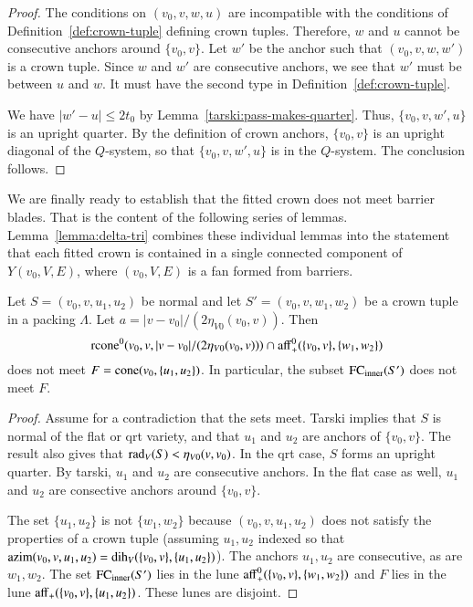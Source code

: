 \begin{proof} The conditions on $(v_0,v,w,u)$ are incompatible with the
conditions of Definition~\ref{def:crown-tuple} defining crown tuples.
Therefore, $w$ and $u$ cannot be consecutive anchors around
$\{v_0,v\}$.  Let $w'$ be the anchor such that $(v_0,v,w,w')$
is a crown tuple.  Since $w$ and $w'$ are consecutive anchors,
we see that $w'$ must be between $u$ and $w$.  It must have the
second type in Definition~\ref{def:crown-tuple}.  

We have $|w'-u|\le 2t_0$ by Lemma~\ref{tarski:pass-makes-quarter}.  
Thus, $\{v_0,v,w',u\}$
is an upright quarter.  By the definition of crown anchors, $\{v_0,v\}$
is an upright diagonal of the $Q$-system, so that $\{v_0,v,w',u\}$ is in
the $Q$-system.
The conclusion follows.
\end{proof}

We are finally ready to establish that the fitted crown does not meet 
barrier blades.  That is the content of the following series of lemmas.
Lemma~\ref{lemma:delta-tri} combines these individual lemmas into the statement that each
fitted crown is contained in a single connected component of $Y(v_0,V,E)$, where
$(v_0,V,E)$ is a fan formed from barriers.

\begin{lemma}  
Let $S=(v_0,v,u_1,u_2)$ be normal and
let $S'=(v_0,v,w_1,w_2)$ be a crown tuple in a packing $\Lambda$.
Let $a = |v-v_0|/(2\eta_{V0}(v_0,v))$.  
Then
$$
 {\operatorname{rcone}}^0(v_0,v,|v-v_0|/(2\eta_{V0}(v_0,v))) \cap
  {\operatorname{aff}}^0_+(\{v_0,v\},\{w_1,w_2\})
$$
does not meet $F={\operatorname{cone}}(v_0,\{u_1,u_2\})$.
In particular, the subset
${\operatorname{FC}}_{\text{inner}}(S')$ does not meet $F$.
\end{lemma}

\begin{proof}  Assume for a contradiction that the sets meet.
Tarski
implies that $S$ is normal of the flat or qrt variety, and 
that $u_1$ and $u_2$ are anchors of $\{v_0,v\}$.  
The result also gives that 
$\operatorname{rad}_V(S)<\eta_{V0}(v,v_0)$.    
In the qrt case, $S$ forms
an upright quarter.  By tarski, $u_1$ and $u_2$
are consecutive anchors. In the flat case as well, 
$u_1$ and $u_2$ are consective
anchors around $\{v_0,v\}$.

The set $\{u_1,u_2\}$ is not $\{w_1,w_2\}$ because $(v_0,v,u_1,u_2)$
does not satisfy the properties of a crown tuple (assuming $u_1,u_2$
indexed so that ${\operatorname{azim}}(v_0,v,u_1,u_2) = \operatorname{dih}_V(\{v_0,v\},\{u_1,u_2\})$).  The anchors $u_1,u_2$ are consecutive, as are $w_1,w_2$.
The set ${\operatorname{FC}}_{\text{inner}}(S')$ lies in the lune ${\operatorname{aff}}_+^0(\{v_0,v\},\{w_1,w_2\})$ and $F$ lies in the lune ${\operatorname{aff}}_+(\{v_0,v\},\{u_1,u_2\})$.
These lunes are disjoint.
%
\end{proof}

